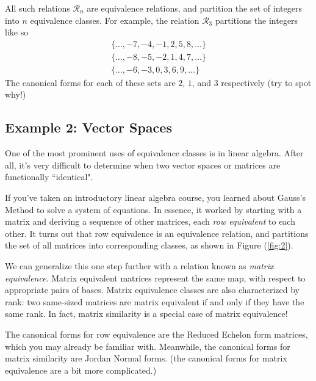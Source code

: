 \documentclass{article}
\begin{document}
        \vspace{2mm}
        All such relations $\mathcal{R}_{n}$ are equivalence relations, and partition the set of integers into $n$ equivalence classes. For example, the relation $\mathcal{R}_{3}$ partitions the integers like so
        \begin{gather*}
            \{\dots, -7, -4, -1, 2, 5, 8, \dots\} \\
            \{\dots, -8, -5, -2, 1, 4, 7, \dots\} \\
            \{\dots, -6, -3, 0, 3, 6, 9, \dots\}
        \end{gather*}
        The canonical forms for each of these sets are $2$, $1$, and $3$ respectively (try to spot why!)


    \subsection*{Example 2: Vector Spaces}
        One of the most prominent uses of equivalence classes is in linear algebra. After all, it's very difficult to determine when two vector spaces or matrices are functionally ``identical". 

        \vspace{3mm}
        If you've taken an introductory linear algebra course, you learned about Gauss's Method to solve a system of equations. In essence, it worked by starting with a matrix and deriving a sequence of other matrices, each \textit{row equivalent} to each other. It turns out that row equivalence is an equivalence relation, and partitions the set of all matrices into corresponding classes, as shown in Figure (\ref{fig:2}).

        \vspace{3mm}
        We can generalize this one step further with a relation known as \textit{matrix equivalence}. Matrix equivalent matrices represent the same map, with respect to appropriate pairs of bases. Matrix equivalence classes are also characterized by rank: two same-sized matrices are matrix equivalent if and only if they have the same rank. In fact, matrix similarity is a special case of matrix equivalence!

        \vspace{3mm}
         The canonical forms for row equivalence are the Reduced Echelon form matrices, which you may already be familiar with. Meanwhile, the canonical forms for matrix similarity are Jordan Normal forms. (the canonical forms for matrix equivalence are a bit more complicated.)
        
\end{document}
